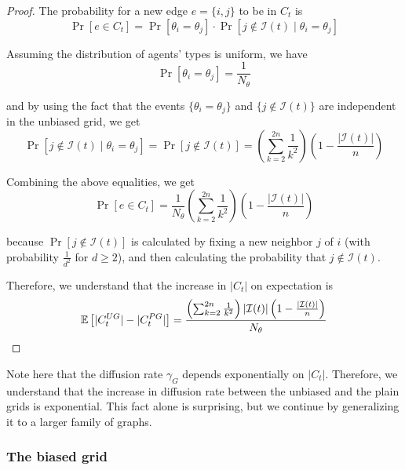 \documentclass[format=acmsmall, review=false]{acmart}
\begin{document}
\begin{proof}
\par The probability for a new edge $e = \{ i, j \}$ to be in $C_t$ is
\begin{equation}\label{probE}
\Pr \left[ e \in C_t \right] = \Pr \left[ \theta_i = \theta_j \right] \cdot \Pr \left[ j \notin \mathcal{I}(t) \mid \theta_i = \theta_j \right]
\end{equation}

\par Assuming the distribution of agents' types is uniform, we have
\[
\Pr \left[ \theta_i = \theta_j \right] = \frac{1}{N_\theta}
\]

and by using the fact that the events $\{ \theta_i = \theta_j \}$ and $\{ j \notin \mathcal{I}(t) \}$ are independent in
the unbiased grid, we get
\[
\Pr \left[ j \notin \mathcal{I}(t) \mid \theta_i = \theta_j \right] = \Pr \left[ j \notin \mathcal{I}(t) \right] = \left( \sum_{k = 2}^{2n} {\frac{1}{k^2}} \right) \left( 1 - \frac{|\mathcal{I}(t)|}{n} \right)
\]

\par Combining the above equalities, we get
\[
\Pr \left[ e \in C_t \right] = \frac{1}{N_\theta} \left( \sum_{k = 2}^{2n} {\frac{1}{k^2}} \right) \left( 1 - \frac{|\mathcal{I}(t)|}{n} \right)
\]

because $\Pr \left[ j \notin \mathcal{I}(t) \right]$ is calculated by fixing a new neighbor $j$ of $i$ (with probability
$\frac{1}{d^2}$ for $d \geq 2$), and then calculating the probability that $j \notin \mathcal{I}(t)$.

\par Therefore, we understand that the increase in $|C_t|$ on expectation is
\begin{equation}\label{incrUG}
\mathbb{E} \left[ |C^{UG}_t| - |C^{PG}_t| \right] = \frac{\left( \sum_{k = 2}^{2n} {\frac{1}{k^2}} \right) |\mathcal{I}(t)| \left( 1 - \frac{|\mathcal{I}(t)|}{n} \right) }{N_\theta} \qedhere
\end{equation}
\end{proof}

\par Note here that the diffusion rate $\gamma_G$ depends exponentially on $|C_t|$. Therefore, we understand that the increase
in diffusion rate between the unbiased and the plain grids is exponential. This fact alone is surprising, but we continue
by generalizing it to a larger family of graphs.

\subsubsection{\textbf{The biased grid}}
\end{document}

